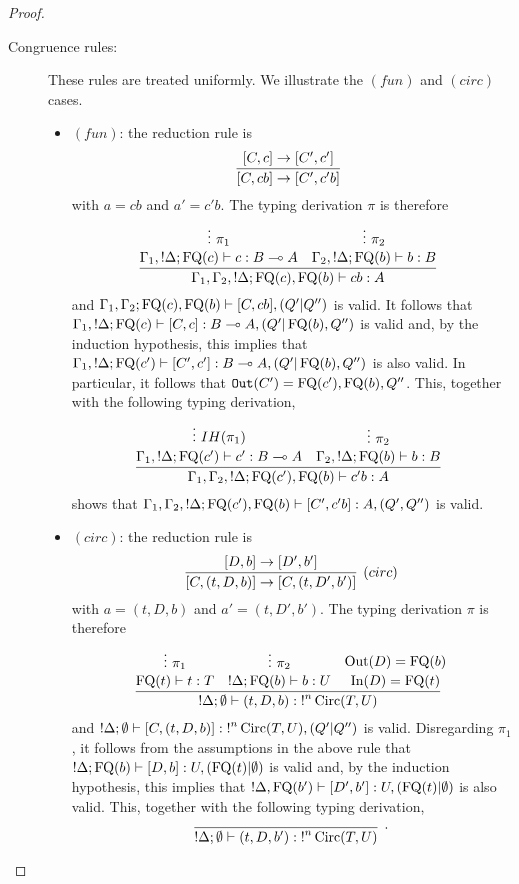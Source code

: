 \documentclass[twoside]{article}
\begin{document}
\begin{proof}
\begin{description}
\item[Congruence rules:] These rules are treated uniformly. We illustrate the 
$(fun)$ and $(circ)$ cases.
\begin{itemize}
  \item $(fun)$: the reduction rule is
  \[
    \infer[]{[C,cb]\to[C',c'b]}{
      [C,c]\to[C',c']
    }
  \]
  with $a=cb$ and $a'=c'b$. The typing derivation $\pi$ is therefore
  \[
    \infer[]{\Gamma_1,\Gamma_2, {!}\Delta;\FQ(c),\FQ(b)\entails cb:A}{
      \deduce[]{\Gamma_1, {!}\Delta;\FQ(c)\entails c:B\loli A}{
        \vdots~\pi_1
      } 
      &
      \deduce[]{\Gamma_2, {!}\Delta ;\FQ(b)\entails b:B}{
        \vdots~\pi_2
      } 
    }
  \]
  and $\Gamma_1,\Gamma_2;\mathop{\textrm{FQ}}\nolimits(c),\mathop{\textrm{FQ}}\nolimits(b)\vdash [C, cb],(Q'|Q'')$ is valid.
  It follows that $\Gamma_1, {!}\Delta;\mathop{\textrm{FQ}}\nolimits(c)\vdash [C,c]:B\multimap A,(Q'|\mathop{\textrm{FQ}}\nolimits(b),Q'')$ 
  is valid and, by the induction hypothesis, this implies that 
  $\Gamma_1, {!}\Delta;\mathop{\textrm{FQ}}\nolimits(c')\vdash [C',c']:B\multimap A,(Q'|\mathop{\textrm{FQ}}\nolimits(b),Q'')$ is also valid.
  In particular, it follows that $\mathtt{Out}(C')=\mathop{\textrm{FQ}}\nolimits(c'),\mathop{\textrm{FQ}}\nolimits(b),Q''$. This, 
  together with the following typing derivation,
  \[
    \infer[]{\Gamma_1,\Gamma_2, {!}\Delta;\FQ(c'),\FQ(b)\entails c'b:A}{
      \deduce[]{\Gamma_1, {!}\Delta;\FQ(c')\entails c':B\loli A}{
        \vdots~IH(\pi_1)
      } 
      &
      \deduce[]{\Gamma_2, {!}\Delta ;\FQ(b)\entails b:B}{
        \vdots~\pi_2
      } 
    }
  \]  
  shows that $\Gamma_1,\Gamma_2, {!}\Delta;\mathop{\textrm{FQ}}\nolimits(c'),\mathop{\textrm{FQ}}\nolimits(b)\vdash [C',c'b]:A,(Q',Q'')$ 
  is valid.
  \item $(circ)$: the reduction rule is
  \[
    \infer[(circ)]{[C, (t,D,b)]\to [C, (t,D',b')]}{
      [D,b]\to [D',b']
    }
  \]  
  with $a=(t,D,b)$ and $a'=(t,D',b')$. The typing derivation $\pi$ is therefore
  \[
  \infer[]{{!}\Delta;\emptyset\entails (t,D,b):{!}^n\Circ(T,U)}{
    \deduce[]{\FQ(t)\entails t:T}{
      \vdots~\pi_1
    } 
    &
    \deduce[]{{!}\Delta ; \FQ(b)\entails b:U}{
      \vdots~\pi_2
    }
    &
    \deduce[]{\In(D)=\FQ(t)}{
      \Out(D)=\FQ(b)
    }
  }
  \]  
  and ${!}\Delta ; \emptyset \vdash [C,(t,D,b)]:{!}^n\mathop{\textrm{Circ}}\nolimits(T,U),(Q'|Q'')$ is valid. 
  Disregarding $\pi_1$, it follows from the assumptions in the above rule 
  that ${!}\Delta ; \mathop{\textrm{FQ}}\nolimits(b)\vdash [D,b]:U, (\mathop{\textrm{FQ}}\nolimits(t)|\emptyset)$ is valid and, 
  by the induction hypothesis, this implies that 
  ${!}\Delta,\mathop{\textrm{FQ}}\nolimits(b')\vdash [D',b']:U,(\mathop{\textrm{FQ}}\nolimits(t)|\emptyset)$ is also valid.
  This, together with the following typing derivation,
  \[
  \infer[.]{{!}\Delta;\emptyset\entails (t,D,b'):{!}^n\Circ(T,U)}{
}\]
\end{itemize}
\end{description}
\end{proof}
\end{document}
